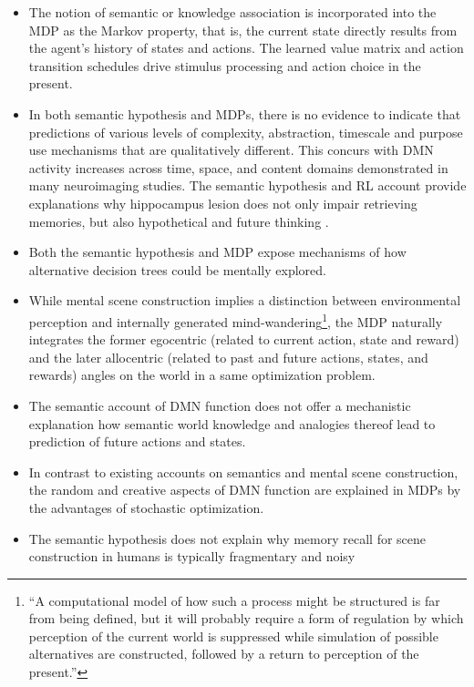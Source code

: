 \documentclass{article} %
\begin{document}
\begin{itemize}
  \item The notion of semantic or knowledge association is
  incorporated into the MDP as the Markov property,
  that is, the current state directly results from the
  agent's history of states and actions. The learned
  value matrix and action transition schedules drive
  stimulus processing and action choice in the present.
  \item In both semantic hypothesis and MDPs,
  there is no evidence to indicate that predictions of various
  levels of complexity, abstraction, timescale and purpose
  use mechanisms that are qualitatively different. This concurs with
  DMN activity increases across time, space, and content domains
  demonstrated in many neuroimaging studies. The semantic hypothesis
  and RL account provide explanations why hippocampus lesion does
  not only impair retrieving memories, but also hypothetical and future
  thinking \cite{hassabis2007patients}.
  \item Both the semantic hypothesis and MDP expose mechanisms of
  how alternative decision trees could be mentally explored.
  \item While mental scene construction implies a distinction between
  environmental perception and internally generated mind-wandering\footnote{
  ``A computational model of how such a process might be structured
  is far from being defined, but it will probably require a form of
  regulation by which perception of the current world is suppressed
  while simulation of possible alternatives are constructed,
  followed by a return to perception of the present.''\cite{buckner2007self}},
  the MDP naturally integrates the former egocentric
  (related to current action, state and reward) and the later
  allocentric (related to past and future actions, states, and rewards)
  angles on the world in a same optimization problem.
  \item The semantic account of DMN function does not offer 
  a mechanistic explanation how semantic world knowledge and analogies thereof
  lead to prediction of future actions and states.
  \item In contrast to existing accounts on semantics and
  mental scene construction, the random and creative aspects of DMN function
  are explained in MDPs by the advantages of stochastic optimization.
  \item The semantic hypothesis does not explain why memory recall
  for scene construction in humans is typically fragmentary and noisy

\end{itemize}
\end{document}
